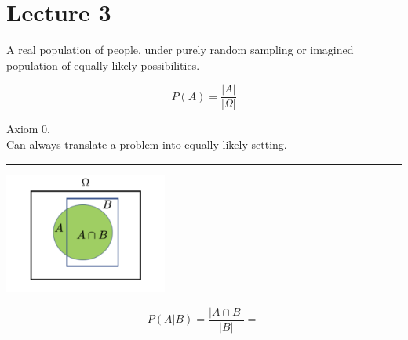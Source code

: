 \documentclass[12pt]{article}
\begin{document}

\section{Lecture 3}

A real population of people, under purely random sampling or imagined
population of equally likely possibilities.

\begin{center}
\[
    P(A) = \frac{|A|}{|\Omega|}
\]
\end{center}
Axiom 0.\\
Can always translate a problem into equally likely setting.

\begin{center}
\rule{4cm}{0.4pt}
\end{center}

\begin{center}
\includegraphics[width=0.4\textwidth]{conditional-probability.png}
\end{center}


\[
    P(A|B) = \frac{|A \cap B|}{|B|} = \frac{}{}
\]
\end{document}
